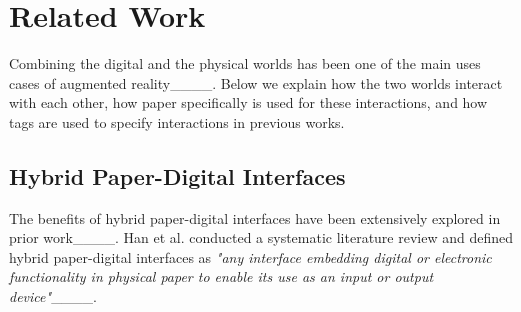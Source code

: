\section{Related Work}
Combining the digital and the physical worlds has been one of the main uses cases of augmented reality____. %
Below we explain how the two worlds interact with each other, how paper specifically is used for these interactions, %
and how tags are used to specify interactions in previous works.





\subsection{Hybrid Paper-Digital Interfaces}
The benefits of hybrid paper-digital interfaces have been extensively explored in prior work____. Han et al. conducted a systematic literature review and defined hybrid paper-digital interfaces as \textit{"any interface embedding digital or electronic functionality in physical paper to enable its use as an input or output device"}____.

